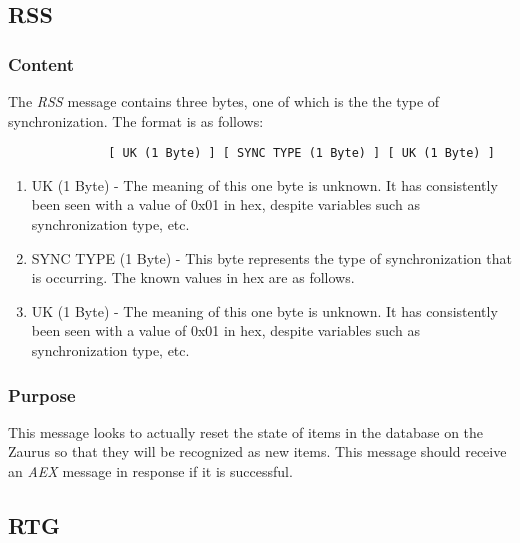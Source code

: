        \subsection{RSS}

            \subsubsection{Content}

            The \emph{RSS} message contains three bytes, one of which is the
            the type of synchronization. The format is as follows:

            \begin{verbatim}
              [ UK (1 Byte) ] [ SYNC TYPE (1 Byte) ] [ UK (1 Byte) ]
            \end{verbatim}

            \begin{enumerate}
            \item UK (1 Byte) - The meaning of this one byte is unknown. It
              has consistently been seen with a value of 0x01 in hex, despite
              variables such as synchronization type, etc.

            \item SYNC TYPE (1 Byte) - This byte represents the type of
              synchronization that is occurring. The known values in hex are
              as follows.

              \synctypes

            \item UK (1 Byte) - The meaning of this one byte is unknown. It
              has consistently been seen with a value of 0x01 in hex, despite
              variables such as synchronization type, etc.

            \end{enumerate}            

            \subsubsection{Purpose}

            This message looks to actually reset the state of items in the
            database on the Zaurus so that they will be recognized as new
            items. This message should receive an \emph{AEX} message in
            response if it is successful.

        \subsection{RTG}

